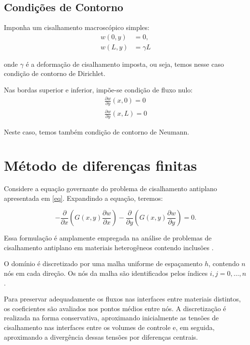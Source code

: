 \documentclass[brazil]{TCAM} %
\begin{document}
\subsection{Condições de Contorno}

Imponha um cisalhamento macroscópico simples:
\begin{eqnarray}
    w(0,y)&= 0, \\
    w(L,y)&= \gamma L
\end{eqnarray}

onde \(\gamma\) é a deformação de cisalhamento imposta, ou seja,  temos nesse caso condição de contorno de Dirichlet.

Nas bordas superior e inferior, impõe-se condição de fluxo nulo:
\begin{eqnarray}
    \frac{\partial w}{\partial y}(x,0)=0 \\
    \frac{\partial w}{\partial y}(x,L)=0
    \label{contorno}
\end{eqnarray}

Neste caso, temos também condição de contorno de Neumann.
\section{Método de diferenças finitas}

Considere a equação governante do problema de cisalhamento antiplano apresentada em \eqref{eq}.
Expandindo a equação, teremos:

\begin{equation*}
- \frac{\partial}{\partial x}
\left(
G(x,y) \frac{\partial w}{\partial x}
\right)
-
\frac{\partial}{\partial y}
\left(
G(x,y) \frac{\partial w}{\partial y}
\right)
=0.
\end{equation*}

Essa formulação é amplamente empregada na análise de problemas de cisalhamento antiplano em materiais heterogêneos contendo inclusões \cite{lin2021simulation}.

O domínio é discretizado por uma malha uniforme de espaçamento $h$,
contendo $n$ nós em cada direção. Os nós da malha são identificados
pelos índices $i,j=0,\ldots,n$.

Para preservar adequadamente os fluxos nas interfaces entre materiais distintos, os coeficientes são avaliados nos pontos médios entre nós.
A discretização é realizada na forma conservativa, aproximando inicialmente as tensões de cisalhamento nas interfaces entre os volumes de controle e, em seguida, aproximando a divergência dessas tensões por diferenças centrais.
\end{document}

